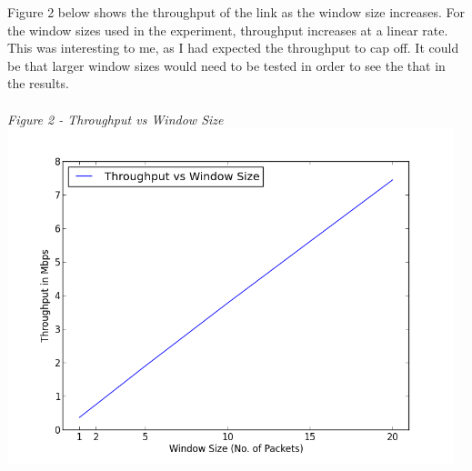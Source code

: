 \documentclass[11pt]{article}
\begin{document}
Figure 2 below shows the throughput of the link as the window size increases. For the window sizes used in the experiment, throughput increases at a linear rate. This was interesting to me, as I had expected the throughput to cap off. It could be that larger window sizes would need to be tested in order to see the that in the results.
\\\\

\textit{Figure 2 - Throughput vs Window Size}
\\
\includegraphics[width=13cm]{data/ThroughputLinePlot}
\end{document}
